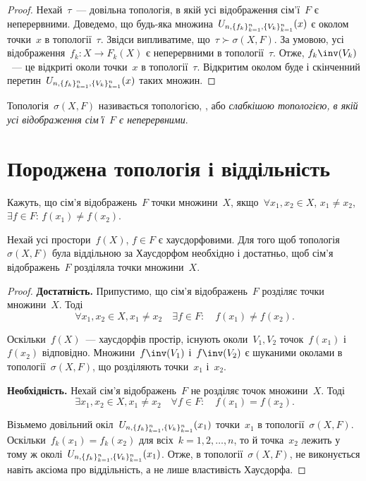 \begin{proof}
    Нехай~$\tau$~--- довільна топологія, в якій усі відображення сім'ї~$F$ є неперервними. Доведемо, що будь-яка множина~$U_{n,\{f_k\}_{k=1}^n,\{V_k\}_{k=1}^n}(x)$ є околом точки~$x$ в топології~$\tau$. Звідси випливатиме, що~$\tau \succ \sigma(X, F)$. За умовою, усі відображення~$f_k: X \to F_k(X)$ є неперервними в топології~$\tau$. Отже, $f_k\inv(V_k)$~--- це відкриті околи точки~$x$ в топології~$\tau$. Відкритим околом буде і скінченний перетин~$U_{n,\{f_k\}_{k=1}^n,\{V_k\}_{k=1}^n}(x)$ таких множин.
\end{proof}

\begin{definition}
    Топологія~$\sigma(X, F)$ називається топологією, , або \emph{слабкішою топологією, в якій усі відображення сім'ї~$F$ є неперервними}.
\end{definition}

\section{Породжена топологія і віддільність}

\begin{definition}
    Кажуть, що сім'я відображень~$F$  точки множини~$X$, якщо~$\forall x_1, x_2 \in X$, $x_1 \ne x_2$, $\exists f \in F$: $f(x_1) \ne f(x_2)$.
\end{definition}

\begin{theorem}
    \label{th:induced-topology-hausdorff-separability-criterion}
    Нехай усі простори~$f(X)$, $f \in F$ є хаусдорфовими. Для того щоб топологія~$\sigma(X, F)$ була віддільною за Хаусдорфом необхідно і достатньо, щоб сім'я відображень~$F$ розділяла точки множини~$X$.
\end{theorem}

\begin{proof}
    \textbf{Достатність.} Припустимо, що сім'я відображень~$F$ розділяє точки множини~$X$. Тоді
    \begin{equation*}
        \forall x_1, x_2 \in X, x_1 \ne x_2 \quad \exists f \in F: \quad f(x_1) \ne f(x_2).
    \end{equation*}

    Оскільки~$f(X)$~--- хаусдорфів простір, існують околи~$V_1, V_2$ точок~$f(x_1)$ і~$f(x_2)$ відповідно. Множини~$f\inv(V_1)$ і~$f\inv(V_2)$ є шуканими околами в топології~$\sigma(X, F)$, що розділяють точки~$x_1$ і~$x_2$.

    \textbf{Необхідність.} Нехай сім'я відображень~$F$ не розділяє точок множини~$X$. Тоді
    \begin{equation*}
        \exists x_1, x_2 \in X, x_1 \ne x_2 \quad \forall f \in F: \quad f(x_1) = f(x_2).
    \end{equation*}

    Візьмемо довільний окіл~$U_{n,\{f_k\}_{k=1}^n,\{V_k\}_{k=1}^n}(x_1)$ точки~$x_1$ в топології~$\sigma(X, F)$. Оскільки~$f_k(x_1) = f_k(x_2)$ для всіх~$k = 1, 2, \dots, n$, то й точка~$x_2$ лежить у тому ж околі~$U_{n,\{f_k\}_{k=1}^n,\{V_k\}_{k=1}^n}(x_1)$. Отже, в топології~$\sigma(X, F)$, не виконується навіть аксіома про віддільність, а не лише властивість Хаусдорфа.
\end{proof}

